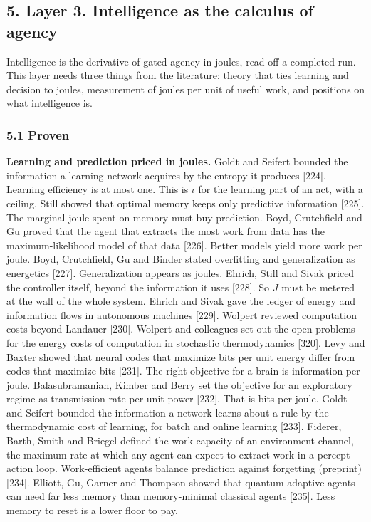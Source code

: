 \documentclass[
  10pt,
]{article}
\begin{document}
\subsection{5. Layer 3. Intelligence as the calculus of
agency}\label{layer-3.-intelligence-as-the-calculus-of-agency}

Intelligence is the derivative of gated agency in joules, read off a
completed run. This layer needs three things from the literature: theory
that ties learning and decision to joules, measurement of joules per
unit of useful work, and positions on what intelligence is.

\subsubsection{5.1 Proven}\label{proven-2}

\textbf{Learning and prediction priced in joules.} Goldt and Seifert
bounded the information a learning network acquires by the entropy it
produces {[}224{]}. Learning efficiency is at most one. This is
\(\iota\) for the learning part of an act, with a ceiling. Still showed
that optimal memory keeps only predictive information {[}225{]}. The
marginal joule spent on memory must buy prediction. Boyd, Crutchfield
and Gu proved that the agent that extracts the most work from data has
the maximum-likelihood model of that data {[}226{]}. Better models yield
more work per joule. Boyd, Crutchfield, Gu and Binder stated overfitting
and generalization as energetics {[}227{]}. Generalization appears as
joules. Ehrich, Still and Sivak priced the controller itself, beyond the
information it uses {[}228{]}. So \(J\) must be metered at the wall of
the whole system. Ehrich and Sivak gave the ledger of energy and
information flows in autonomous machines {[}229{]}. Wolpert reviewed
computation costs beyond Landauer {[}230{]}. Wolpert and colleagues set
out the open problems for the energy costs of computation in stochastic
thermodynamics {[}320{]}. Levy and Baxter showed that neural codes that
maximize bits per unit energy differ from codes that maximize bits
{[}231{]}. The right objective for a brain is information per joule.
Balasubramanian, Kimber and Berry set the objective for an exploratory
regime as transmission rate per unit power {[}232{]}. That is bits per
joule. Goldt and Seifert bounded the information a network learns about
a rule by the thermodynamic cost of learning, for batch and online
learning {[}233{]}. Fiderer, Barth, Smith and Briegel defined the work
capacity of an environment channel, the maximum rate at which any agent
can expect to extract work in a percept-action loop. Work-efficient
agents balance prediction against forgetting (preprint) {[}234{]}.
Elliott, Gu, Garner and Thompson showed that quantum adaptive agents can
need far less memory than memory-minimal classical agents {[}235{]}.
Less memory to reset is a lower floor to pay.
\end{document}
